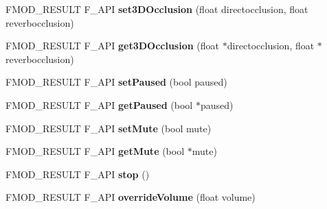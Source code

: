 \begin{DoxyCompactItemize}
\item 
F\+M\+O\+D\+\_\+\+R\+E\+S\+U\+LT F\+\_\+\+A\+PI {\bfseries set3\+D\+Occlusion} (float directocclusion, float reverbocclusion)\hypertarget{class_f_m_o_d_1_1_channel_group_a270e71885163448a8d027cba12d2a167}{}\label{class_f_m_o_d_1_1_channel_group_a270e71885163448a8d027cba12d2a167}

\item 
F\+M\+O\+D\+\_\+\+R\+E\+S\+U\+LT F\+\_\+\+A\+PI {\bfseries get3\+D\+Occlusion} (float $\ast$directocclusion, float $\ast$reverbocclusion)\hypertarget{class_f_m_o_d_1_1_channel_group_ae18b53716e7a672a2e75c215b8a04727}{}\label{class_f_m_o_d_1_1_channel_group_ae18b53716e7a672a2e75c215b8a04727}

\item 
F\+M\+O\+D\+\_\+\+R\+E\+S\+U\+LT F\+\_\+\+A\+PI {\bfseries set\+Paused} (bool paused)\hypertarget{class_f_m_o_d_1_1_channel_group_af0f6206fa355b3620704068e0edc710c}{}\label{class_f_m_o_d_1_1_channel_group_af0f6206fa355b3620704068e0edc710c}

\item 
F\+M\+O\+D\+\_\+\+R\+E\+S\+U\+LT F\+\_\+\+A\+PI {\bfseries get\+Paused} (bool $\ast$paused)\hypertarget{class_f_m_o_d_1_1_channel_group_a2ac97f8510ef2d390c5ae0c92b59b1a4}{}\label{class_f_m_o_d_1_1_channel_group_a2ac97f8510ef2d390c5ae0c92b59b1a4}

\item 
F\+M\+O\+D\+\_\+\+R\+E\+S\+U\+LT F\+\_\+\+A\+PI {\bfseries set\+Mute} (bool mute)\hypertarget{class_f_m_o_d_1_1_channel_group_a7c087657b151724fbfd5971c4ae39a47}{}\label{class_f_m_o_d_1_1_channel_group_a7c087657b151724fbfd5971c4ae39a47}

\item 
F\+M\+O\+D\+\_\+\+R\+E\+S\+U\+LT F\+\_\+\+A\+PI {\bfseries get\+Mute} (bool $\ast$mute)\hypertarget{class_f_m_o_d_1_1_channel_group_adc659b37464df273311518b2184ebd30}{}\label{class_f_m_o_d_1_1_channel_group_adc659b37464df273311518b2184ebd30}

\item 
F\+M\+O\+D\+\_\+\+R\+E\+S\+U\+LT F\+\_\+\+A\+PI {\bfseries stop} ()\hypertarget{class_f_m_o_d_1_1_channel_group_abaf4b796ab3cfa7e3c9b268ee9cabf7b}{}\label{class_f_m_o_d_1_1_channel_group_abaf4b796ab3cfa7e3c9b268ee9cabf7b}

\item 
F\+M\+O\+D\+\_\+\+R\+E\+S\+U\+LT F\+\_\+\+A\+PI {\bfseries override\+Volume} (float volume)\hypertarget{class_f_m_o_d_1_1_channel_group_a660a2aa599765382145b1bd6fc7492a7}{}\label{class_f_m_o_d_1_1_channel_group_a660a2aa599765382145b1bd6fc7492a7}


\end{DoxyCompactItemize}
